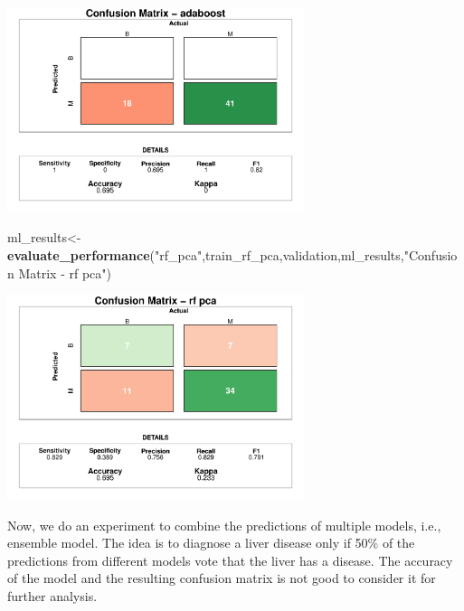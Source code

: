 \documentclass[]{article}
\newenvironment{Shaded}{\begin{snugshade}}{\end{snugshade}}
\newcommand{\KeywordTok}[1]{\textcolor[rgb]{0.13,0.29,0.53}{\textbf{#1}}}
\newcommand{\NormalTok}[1]{#1}
\newcommand{\StringTok}[1]{\textcolor[rgb]{0.31,0.60,0.02}{#1}}
\begin{document}
\begin{center}
\includegraphics[width=0.65\textwidth]{LiverDisease_files/figure-latex/unnamed-chunk-47-1.pdf}
\end{center}


\begin{Shaded}
\begin{Highlighting}[]
\NormalTok{ml_results<-}\KeywordTok{evaluate_performance}\NormalTok{(}\StringTok{"rf_pca"}\NormalTok{,train_rf_pca,validation,ml_results,}\StringTok{"Confusion Matrix - rf pca"}\NormalTok{)}
\end{Highlighting}
\end{Shaded}

\begin{center}
\includegraphics[width=0.65\textwidth]{LiverDisease_files/figure-latex/unnamed-chunk-48-1.pdf}
\end{center}


Now, we do an experiment to combine the predictions of multiple models,
i.e., ensemble model. The idea is to diagnose a liver disease only if
50\% of the predictions from different models vote that the liver has a
disease. The accuracy of the model and the resulting confusion matrix is
not good to consider it for further analysis.
\end{document}
